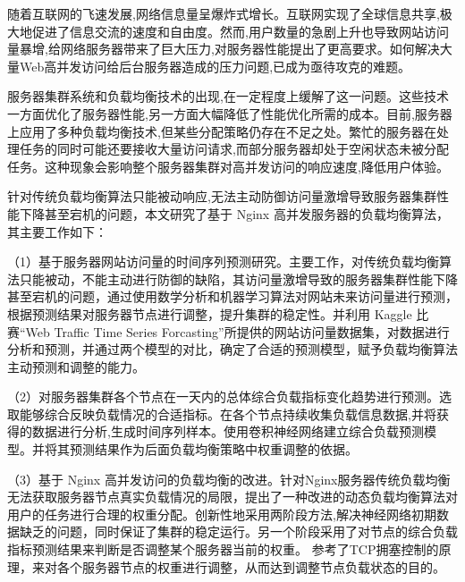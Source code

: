 \begin{cabstract}

随着互联网的飞速发展,网络信息量呈爆炸式增长。互联网实现了全球信息共享,极大地促进了信息交流的速度和自由度。然而,用户数量的急剧上升也导致网站访问量暴增,给网络服务器带来了巨大压力,对服务器性能提出了更高要求。如何解决大量Web高并发访问给后台服务器造成的压力问题,已成为亟待攻克的难题。

服务器集群系统和负载均衡技术的出现,在一定程度上缓解了这一问题。这些技术一方面优化了服务器性能,另一方面大幅降低了性能优化所需的成本。目前,服务器上应用了多种负载均衡技术,但某些分配策略仍存在不足之处。繁忙的服务器在处理任务的同时可能还要接收大量访问请求,而部分服务器却处于空闲状态未被分配任务。这种现象会影响整个服务器集群对高并发访问的响应速度,降低用户体验。

针对传统负载均衡算法只能被动响应,无法主动防御访问量激增导致服务器集群性能下降甚至宕机的问题，本文研究了基于 Nginx 高并发服务器的负载均衡算法，其主要工作如下：

（1）基于服务器网站访问量的时间序列预测研究。主要工作，对传统负载均衡算法只能被动，不能主动进行防御的缺陷，其访问量激增导致的服务器集群性能下降甚至宕机的问题，通过使用数学分析和机器学习算法对网站未来访问量进行预测，根据预测结果对服务器节点进行调整，提升集群的稳定性。并利用 Kaggle 比赛“Web Traffic Time Series Forcasting”所提供的网站访问量数据集，对数据进行分析和预测，并通过两个模型的对比，确定了合适的预测模型，赋予负载均衡算法主动预测和调整的能力。

（2）对服务器集群各个节点在一天内的总体综合负载指标变化趋势进行预测。选取能够综合反映负载情况的合适指标。在各个节点持续收集负载信息数据,并将获得的数据进行分析,生成时间序列样本。使用卷积神经网络建立综合负载预测模型。并将其预测结果作为后面负载均衡策略中权重调整的依据。

（3）基于 Nginx 高并发访问的负载均衡的改进。针对Nginx服务器传统负载均衡无法获取服务器节点真实负载情况的局限，提出了一种改进的动态负载均衡算法对用户的任务进行合理的权重分配。创新性地采用两阶段方法,解决神经网络初期数据缺乏的问题，同时保证了集群的稳定运行。另一个阶段采用了对节点的综合负载指标预测结果来判断是否调整某个服务器当前的权重。
参考了TCP拥塞控制的原理，来对各个服务器节点的权重进行调整，从而达到调整节点负载状态的目的。

\end{cabstract}

